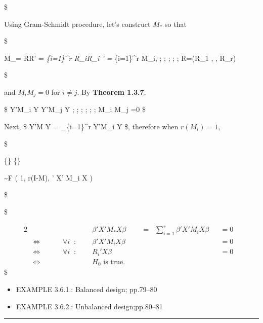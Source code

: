 \documentclass[
]{book}
\providecommand{\tightlist}{%
  \setlength{\itemsep}{0pt}\setlength{\parskip}{0pt}}
\begin{document}
{{{\$

Using Gram-Schmidt procedure, let's construct \(M_\ast\) so that

\$

M\_\ast = RR' = \sum\emph{\{i=1\}\^{}r R\_iR\_i ' = \sum}\{i=1\}\^{}r M\_i, ; ; ; ; ; R=(R\_1 , \cdots, R\_r)

\$

and \(M_i M_j=0\) for \(i \not = j\). By \textbf{Theorem 1.3.7},

\$
Y'M\_i Y \perp Y'M\_j Y ; ; ; \iff ; ; ; M\_i M\_j =0
\$

Next, \$ Y'M Y = \sum\_\{i=1\}\^{}r Y'M\_i Y \$, therefore when \(r(M_i)=1\),

\$

\dfrac

\{\}
\{\}

\sim F \Bigg( 1, r(I-M),  \beta ' X' M\_i X \beta \Bigg)

\$

\$

\begin{alignat}{2}

& && &&   &&\beta ' X' M_\ast X \beta \; \; &&= \; \; \sum_{i=1}^r \beta ' X' M_i X \beta  &&  =0

\; \; \;

\\

&\iff && && \forall i \; \; : \; \; && \beta ' X' M_i X \beta && &&=0

\\

&\iff && &&\forall i \; \; : \; \; &&R_i ' X \beta && &&= 0

\\

&\iff && && &&H_0 \text{ is true.}




\end{alignat}
\$

\begin{itemize}
\tightlist
\item
  EXAMPLE 3.6.1.: Balanced design; pp.79--80
\item
  EXAMPLE 3.6.2.: Unbalanced design;pp.80--81
\end{itemize}

\begin{center}\rule{0.5\linewidth}{0.5pt}\end{center}

}}}
\end{document}
